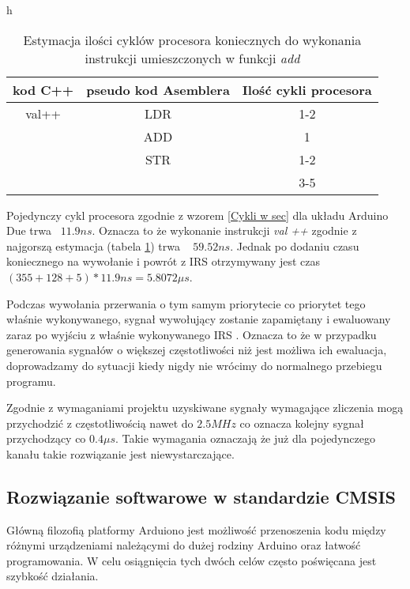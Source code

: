 \begin{table}{h}
        \begin{center}
        \caption{Estymacja ilości cyklów procesora koniecznych do wykonania instrukcji umieszczonych w funkcji \textit{add} }
        \label{decompile add}
        \begin{tabular}{c|c|c}
                kod C++ & pseudo kod Asemblera & Ilość cykli procesora \cite{cycles} \\ \hline
                val++ & LDR & 1-2 \\
                        & ADD & 1 \\
                        & STR & 1-2 \\ 
                        \hline \hline
                        &   &  3-5 
        \end{tabular}
        \end{center}
\end{table}

Pojedynczy cykl procesora zgodnie z wzorem \ref{Cykli w sec} dla układu Arduino Due trwa ~$ 11.9 ns $. 
Oznacza to że wykonanie instrukcji \textit{val ++} zgodnie z najgorszą estymacja (tabela \ref{decompile add}) trwa ~ $59.52 ns$. 
Jednak po dodaniu czasu koniecznego na wywołanie i powrót z IRS otrzymywany jest czas $ (355 + 128 + 5) * 11.9 ns =  5.8072 \mu s $. 

Podczas wywołania przerwania o tym samym priorytecie co priorytet tego właśnie wykonywanego, sygnał wywołujący zostanie zapamiętany i ewaluowany zaraz po wyjściu z właśnie wykonywanego IRS  \cite{datasheet}. 
Oznacza to że w przypadku generowania sygnałów o większej częstotliwości niż jest możliwa ich ewaluacja, doprowadzamy do sytuacji kiedy nigdy nie wrócimy do normalnego przebiegu programu. 

Zgodnie z wymaganiami projektu uzyskiwane sygnały wymagające zliczenia mogą przychodzić z częstotliwością nawet do $2.5MHz$ co oznacza kolejny sygnał przychodzący co $0.4\mu s$.
Takie wymagania oznaczają że już dla pojedynczego kanału takie rozwiązanie jest niewystarczające. 

\subsection{Rozwiązanie softwarowe w standardzie CMSIS}
Główną filozofią platformy Arduiono jest możliwość przenoszenia kodu między różnymi urządzeniami należącymi do dużej rodziny Arduino oraz łatwość programowania.
W celu osiągnięcia tych dwóch celów często poświęcana jest szybkość działania. 

